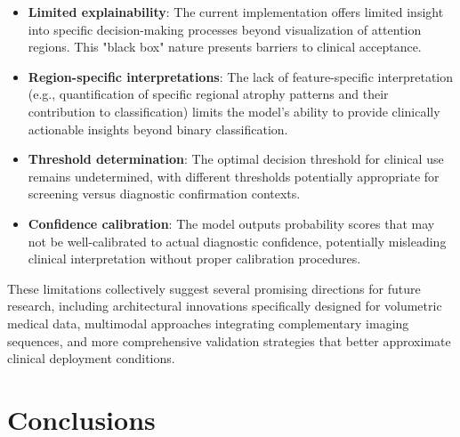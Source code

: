 \documentclass[12pt, a4paper]{article}
\begin{document}
\begin{itemize}
    \item \textbf{Limited explainability}: The current implementation offers limited insight into specific decision-making processes beyond visualization of attention regions. This "black box" nature presents barriers to clinical acceptance.
    
    \item \textbf{Region-specific interpretations}: The lack of feature-specific interpretation (e.g., quantification of specific regional atrophy patterns and their contribution to classification) limits the model's ability to provide clinically actionable insights beyond binary classification.
    
    \item \textbf{Threshold determination}: The optimal decision threshold for clinical use remains undetermined, with different thresholds potentially appropriate for screening versus diagnostic confirmation contexts.
    
    \item \textbf{Confidence calibration}: The model outputs probability scores that may not be well-calibrated to actual diagnostic confidence, potentially misleading clinical interpretation without proper calibration procedures.
\end{itemize}

These limitations collectively suggest several promising directions for future research, including architectural innovations specifically designed for volumetric medical data, multimodal approaches integrating complementary imaging sequences, and more comprehensive validation strategies that better approximate clinical deployment conditions.

\section{Conclusions}




\end{document}
